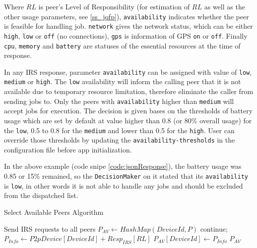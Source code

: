 \documentclass[conference]{IEEEtran}
\begin{document}
Where $RL$ is peer's Level of Responsibility (for estimation of $RL$ as well as the other usage parameters, see \ref{ss_jqfp}), \texttt{availability} indicates whether the peer is feasible for handling job. \texttt{network} gives the network status, which can be either \texttt{high}, \texttt{low} or \texttt{off} (no connections), \texttt{gps} is information of GPS \texttt{on} or \texttt{off}. Finally \texttt{cpu}, \texttt{memory} and \texttt{battery} are statuses of the essential resources at the time of response. 

In any IRS response, parameter \texttt{availability} can be assigned with value of \texttt{low}, \texttt{medium} or \texttt{high}. The \texttt{low} availability will inform the calling peer that it is not available due to temporary resource limitation, therefore eliminate the caller from sending jobs to. Only the peers with \texttt{availability} higher than \texttt{medium} will accept jobs for execution. The decision is given bases on the thresholds of battery usage which are set by default at value higher than 0.8 (or 80\% overall usage) for the \texttt{low}, 0.5 to 0.8 for the \texttt{medium} and lower than 0.5 for the \texttt{high}. User can override those thresholds by updating the \texttt{availability-thresholds} in the configuration file before app initialization. 

In the above example (code snipe \ref{code:jsonResponse}), the battery usage was 0.85 or 15\% remained, so the \texttt{DecisionMaker} on it stated that its \texttt{availability} is \texttt{low}, in other words it is not able to handle any jobs and should be excluded from the dispatched list.

\begin{algorithm}

\caption{Select Available Peers Algorithm}
\label{alg:select_peers}
\begin{algorithmic}[1] 
\begin{footnotesize}
\State Send IRS requests to all peers 
\State $P_{AV} \leftarrow HashMap(DeviceId, P)$
   \State continue;
\Else
  \State $P_{Info} \leftarrow P2pDevice[DeviceId] + Resp_{IRS}[RL]$
  \State $P_{AV}[DeviceId] \leftarrow P_{Info}$
\EndIf
\EndFor
\State \Return $P_{AV}$
\EndFunction
\end{footnotesize}
\end{algorithmic}

\end{algorithm}
\end{document}
